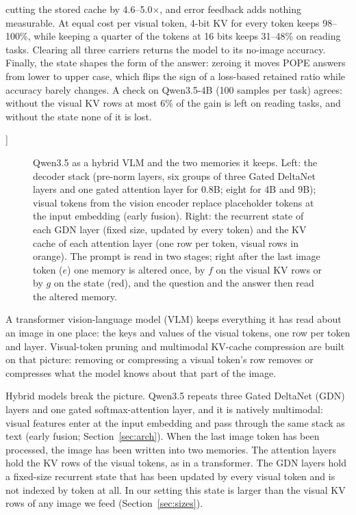 \documentclass[10pt,twocolumn]{article}
\makeatletter
\renewcommand\section{\@startsection{section}{1}{\z@}{-2.0ex plus -0.5ex minus -0.2ex}{1.5ex plus 0.3ex minus 0.2ex}{\large\bfseries\raggedright}}
\makeatother
\begin{document}
{\begin{list}{}{\leftmargin=0.5in\rightmargin=0.5in}
cutting the stored cache by 4.6--5.0$\times$, and error feedback adds nothing measurable. At equal cost per visual
token, 4-bit KV for every token keeps 98--100\%, while keeping a quarter of the tokens at 16 bits keeps 31--48\% on
reading tasks. Clearing all three carriers returns the model to its no-image accuracy. Finally, the state shapes the
form of the answer: zeroing it moves POPE answers from lower to upper case, which flips the sign of a loss-based
retained ratio while accuracy barely changes. A check on Qwen3.5-4B (100 samples per task) agrees: without the
visual KV rows at most 6\% of the gain is left on reading tasks, and without the state none of it is lost.
\end{list}
\vspace{0.25in}
}]

\section{Introduction}

\begin{figure}[tbp]
\centering
\resizebox{0.66\textwidth}{!}{}
\caption{Qwen3.5 as a hybrid VLM and the two memories it keeps. Left: the decoder stack (pre-norm layers, six
groups of three Gated DeltaNet layers and one gated attention layer for 0.8B; eight for 4B and 9B); visual tokens from the vision
encoder replace placeholder tokens at the input embedding (early fusion). Right: the recurrent state of each GDN
layer (fixed size, updated by every token) and the KV cache of each attention layer (one row per token, visual rows
in orange). The prompt is read in two stages; right after the last image token ($e$) one memory is altered once,
by $f$ on the visual KV rows or by $g$ on the state (red), and the question and the answer then read the altered
memory.}
\label{fig:overview}
\end{figure}

A transformer vision-language model (VLM) keeps everything it has read about an image in one place: the keys and
values of the visual tokens, one row per token and layer. Visual-token pruning
\citep{chen2024fastv,zhang2025sparsevlm,shang2025prumerge,yang2025visionzip,xing2025pyramiddrop} and multimodal
KV-cache compression \citep{wan2024lookm,tu2025vlcache} are built on that picture: removing or compressing a visual
token's row removes or compresses what the model knows about that part of the image.

Hybrid models break the picture. Qwen3.5 \citep{qwen2026qwen35} repeats three Gated DeltaNet (GDN) layers
\citep{yang2025gdn} and one gated softmax-attention layer, and it is natively multimodal: visual features enter
at the input embedding and pass through the same stack as text (early fusion; Section~\ref{sec:arch}). When the
last image token has been processed, the image has been written into two memories. The attention layers hold the
KV rows of the visual tokens, as in a transformer. The GDN layers hold a fixed-size recurrent state that has been
updated by every visual token and is not indexed by token at all. In our setting this state is larger than the
visual KV rows of any image we feed (Section~\ref{sec:sizes}).
\end{document}
